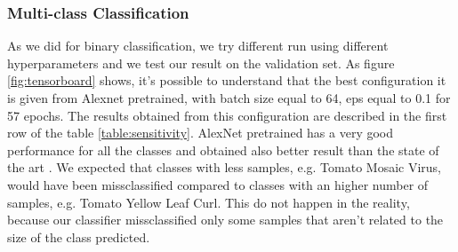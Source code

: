 \subsubsection{Multi-class Classification}
As we did for binary classification, we try different run using different hyperparameters and we test our result on the validation set. As figure \ref{fig:tensorboard} shows, it's possible to understand that the best configuration it is given from Alexnet pretrained, with batch size equal to 64, eps equal to 0.1 for 57 epochs. The results obtained from this configuration are described in the first row of the table \ref{table:sensitivity}. AlexNet pretrained has a very good performance for all the classes and obtained also better result than the state of the art \cite{ref11}. We expected that classes with less samples, e.g. Tomato Mosaic Virus, would have been missclassified compared to classes with an higher number of samples, e.g. Tomato Yellow Leaf Curl. This do not happen in the reality, because our classifier missclassified only some samples that aren't related to the size of the class predicted.
